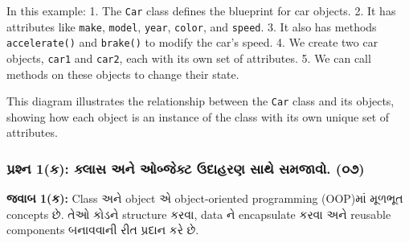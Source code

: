 In this example: 1. The \texttt{Car} class defines the blueprint for car
objects. 2. It has attributes like \texttt{make}, \texttt{model},
\texttt{year}, \texttt{color}, and \texttt{speed}. 3. It also has
methods \texttt{accelerate()} and \texttt{brake()} to modify the car's
speed. 4. We create two car objects, \texttt{car1} and \texttt{car2},
each with its own set of attributes. 5. We can call methods on these
objects to change their state.

\begin{Shaded}
\begin{Highlighting}[]
\NormalTok{    \}}
    
\NormalTok{    \}}
    
\NormalTok{    \}}
\end{Highlighting}
\end{Shaded}

This diagram illustrates the relationship between the \texttt{Car} class
and its objects, showing how each object is an instance of the class
with its own unique set of attributes.

\hypertarget{uxaaauxab0uxab6uxaa8-1uxa95-uxa95uxab2uxab8-uxa85uxaa8-uxa93uxaacuxa9cuxa95uxa9f-uxa89uxaa6uxab9uxab0uxaa3-uxab8uxaa5-uxab8uxaaeuxa9cuxab5.-uxae6uxaed}{%
\subsubsection{પ્રશ્ન 1(ક): ક્લાસ અને ઓબ્જેક્ટ ઉદાહરણ સાથે સમજાવો.
(૦૭)}\label{uxaaauxab0uxab6uxaa8-1uxa95-uxa95uxab2uxab8-uxa85uxaa8-uxa93uxaacuxa9cuxa95uxa9f-uxa89uxaa6uxab9uxab0uxaa3-uxab8uxaa5-uxab8uxaaeuxa9cuxab5.-uxae6uxaed}}

\textbf{જવાબ 1(ક):} Class અને object એ object-oriented programming
(OOP)માં મૂળભૂત concepts છે. તેઓ કોડને structure કરવા, data ને encapsulate કરવા
અને reusable components બનાવવાની રીત પ્રદાન કરે છે.

